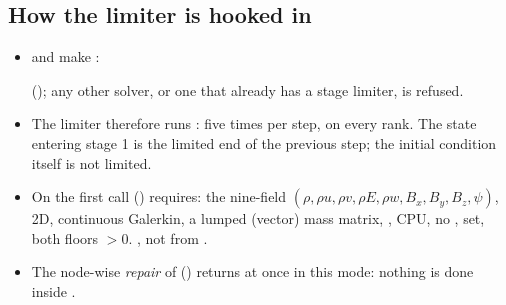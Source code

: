 \subsection*{How the limiter is hooked in}
\begin{itemize}[leftmargin=*]
\item {} and  make
 :
\begin{center}\small{}\end{center}
(); any other solver, or one that already has a stage limiter, is refused.
\item The limiter therefore runs : five
times per step, on every rank. The state entering stage 1 is the limited end of the previous step; the initial
condition itself is not limited.
\item On the first call  () requires: the nine-field
 $(\rho,\rho u,\rho v,\rho E,\rho w,B_x,B_y,B_z,\psi)$, 2D, continuous Galerkin, a lumped
(vector) mass matrix, , CPU, no ,  set, both floors $>0$.
, not from .
\item The node-wise \emph{repair} of  () returns at once in this
mode: nothing is done inside .
\end{itemize}

